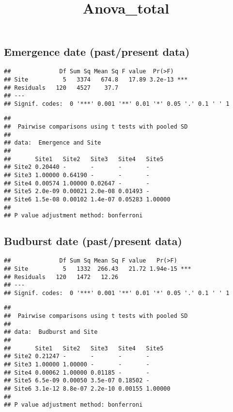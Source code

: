 \documentclass[
]{article}
\title{Anova\_total}
\author{}
\date{\vspace{-2.5em}}
\begin{document}
\maketitle

\hypertarget{emergence-date-pastpresent-data}{%
\subsection{Emergence date (past/present
data)}\label{emergence-date-pastpresent-data}}

\begin{verbatim}
##              Df Sum Sq Mean Sq F value  Pr(>F)    
## Site          5   3374   674.8   17.89 3.2e-13 ***
## Residuals   120   4527    37.7                    
## ---
## Signif. codes:  0 '***' 0.001 '**' 0.01 '*' 0.05 '.' 0.1 ' ' 1
\end{verbatim}

\begin{verbatim}
## 
##  Pairwise comparisons using t tests with pooled SD 
## 
## data:  Emergence and Site 
## 
##       Site1   Site2   Site3   Site4   Site5  
## Site2 0.20440 -       -       -       -      
## Site3 1.00000 0.64190 -       -       -      
## Site4 0.00574 1.00000 0.02647 -       -      
## Site5 2.0e-09 0.00021 2.0e-08 0.01493 -      
## Site6 1.5e-08 0.00102 1.4e-07 0.05283 1.00000
## 
## P value adjustment method: bonferroni
\end{verbatim}

\hypertarget{budburst-date-pastpresent-data}{%
\subsection{Budburst date (past/present
data)}\label{budburst-date-pastpresent-data}}

\begin{verbatim}
##              Df Sum Sq Mean Sq F value   Pr(>F)    
## Site          5   1332  266.43   21.72 1.94e-15 ***
## Residuals   120   1472   12.26                     
## ---
## Signif. codes:  0 '***' 0.001 '**' 0.01 '*' 0.05 '.' 0.1 ' ' 1
\end{verbatim}

\begin{verbatim}
## 
##  Pairwise comparisons using t tests with pooled SD 
## 
## data:  Budburst and Site 
## 
##       Site1   Site2   Site3   Site4   Site5  
## Site2 0.21247 -       -       -       -      
## Site3 1.00000 1.00000 -       -       -      
## Site4 0.00062 1.00000 0.01185 -       -      
## Site5 6.5e-09 0.00050 3.5e-07 0.18502 -      
## Site6 3.1e-12 8.8e-07 2.2e-10 0.00155 1.00000
## 
## P value adjustment method: bonferroni
\end{verbatim}
\end{document}
